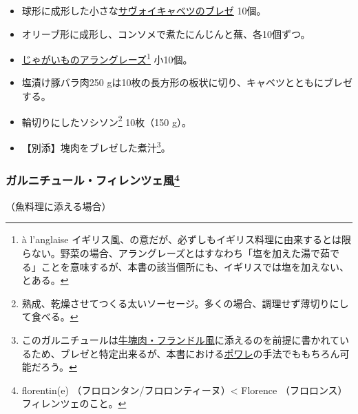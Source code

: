 \begin{recette}
\begin{itemize}
\item
  球形に成形した小さな\protect\hyperlink{chou-braise}{サヴォイキャベツのブレゼ}
  10個。
\item
  オリーブ形に成形し、コンソメで煮たにんじんと蕪、各10個ずつ。
\item
  \protect\hyperlink{pommes-de-terres-anglaise}{じゃがいものアラングレーズ}\footnote{à
    l'anglaise
    イギリス風、の意だが、必ずしもイギリス料理に由来するとは限らない。野菜の場合、アラングレーズとはすなわち「塩を加えた湯で茹でる」ことを意味するが、本書の該当個所にも、イギリスでは塩を加えない、とある。}
  小10個。
\item
  塩漬け豚バラ肉250
  gは10枚の長方形の板状に切り、キャベツとともにブレゼする。
\item
  輪切りにしたソシソン\footnote{熟成、乾燥させてつくる太いソーセージ。多くの場合、調理せず薄切りにして食べる。}
  10枚（150 g）。
\item
  【別添】塊肉をブレゼした煮汁\footnote{このガルニチュールは\protect\hyperlink{piece-de-boeuf-flammande}{牛塊肉・フランドル風}に添えるのを前提に書かれているため、ブレゼと特定出来るが、本書における\protect\hyperlink{les-poeles}{ポワレ}の手法でももちろん可能だろう。}。
\end{itemize}

\atoaki{}

\hypertarget{garniture-florentine}{%
\subsubsection[ガルニチュール・フィレンツェ風]{\texorpdfstring{ガルニチュール・フィレンツェ風\footnote{florentin(e)
  （フロロンタン/フロロンティーヌ）\textless{} Florence
  （フロロンス）フィレンツェのこと。}}{ガルニチュール・フィレンツェ風}}\label{garniture-florentine}}



（魚料理に添える場合）


\end{recette}
